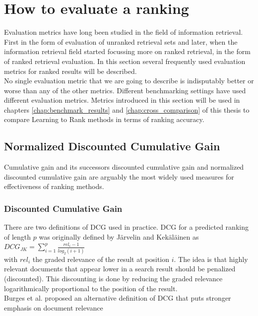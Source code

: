 \section{How to evaluate a ranking}
\label{sec:how_to_evaluate_a_ranking}
Evaluation metrics have long been studied in the field of information retrieval. First in the form of evaluation of unranked retrieval sets and later, when the information retrieval field started focussing more on ranked retrieval, in the form of ranked retrieval evaluation. In this section several frequently used evaluation metrics for ranked results will be described.\\

No single evaluation metric that we are going to describe is indisputably better or worse than any of the other metrics. Different benchmarking settings have used different evaluation metrics. Metrics introduced in this section will be used in chapters \ref{chap:benchmark_results} and \ref{chap:cross_comparison} of this thesis to compare Learning to Rank methods in terms of ranking accuracy.
\subsection{Normalized Discounted Cumulative Gain}
Cumulative gain and its successors discounted cumulative gain and normalized discounted cumulative gain are arguably the most widely used measures for effectiveness of ranking methods.
\subsubsection{Discounted Cumulative Gain}
There are two definitions of \ac{DCG} used in practice. \ac{DCG} for a predicted ranking of length $p$ was originally defined by J{\"a}rvelin and Kek{\"a}l{\"a}inen \cite{Jarvelin2002} as\\

$DCG_{JK} = \sum\nolimits_{i=1}^p \frac{rel_i-1}{log_2(i+1)}$\\

with $rel_i$ the graded relevance of the result at position $i$. The idea is that highly relevant documents that appear lower in a search result should be penalized (discounted). This discounting is done by reducing the graded relevance  logarithmically proportional to the position of the result.\\

Burges et al. \cite{Burges2005} proposed an alternative definition of \ac{DCG} that puts stronger emphasis on document relevance\\

